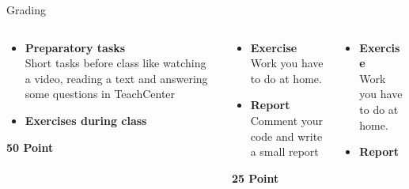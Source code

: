 \documentclass[aspectratio=169]{beamer}
\begin{document}
\begin{frame}{Grading}
    \vspace{-0.5cm}
    \begin{columns}
        \begin{column}{0.32\textwidth}
            \begin{coloredblock}[blue][Participation][\footnotesize\centering][][6.5cm]
                \begin{itemize}
                    \item \footnotesize \textbf{Preparatory tasks}\\
                    Short tasks before class like watching a video, reading a text and answering some questions in TeachCenter
                    \item \footnotesize \textbf{Exercises during class}
                \end{itemize}
            \end{coloredblock}
            \vspace{-.3cm}
            \centering \footnotesize \textbf{50 Point}
        \end{column}
        \begin{column}{0.32\textwidth}
            \begin{coloredblock}[blue][Homework 1][\footnotesize\centering][][6.5cm]
                \begin{itemize}
                    \item \footnotesize \textbf{Exercise}\\
                    Work you have to do at home.
                    \item \footnotesize \textbf{Report}\\
                    Comment your code and write a small report
                \end{itemize}
            \end{coloredblock}
            \vspace{-.3cm}
            \centering \footnotesize \textbf{25 Point}
        \end{column}
        \begin{column}{0.32\textwidth}
            \begin{coloredblock}[blue][Homework 2][\footnotesize\centering][][6.5cm]
                \begin{itemize}
                    \item \footnotesize \textbf{Exercise}\\
                    Work you have to do at home.
                    \item \footnotesize \textbf{Report}\\

\end{itemize}
\end{coloredblock}
\end{column}
\end{columns}
\end{frame}
\end{document}
